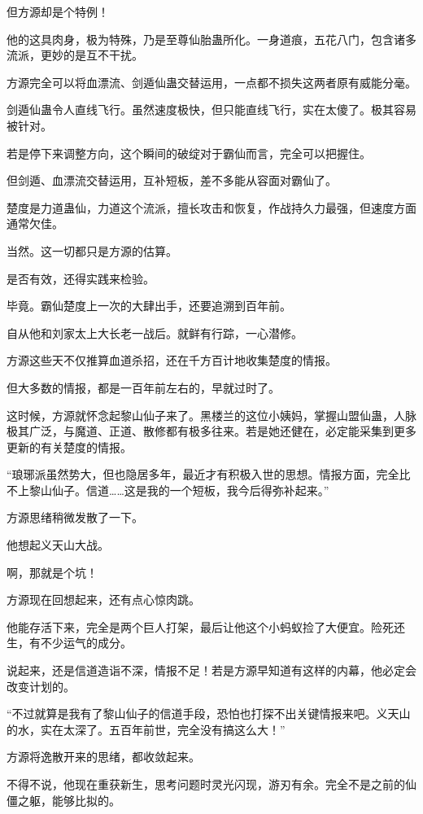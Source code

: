 \begin{this_body}
但方源却是个特例！

他的这具肉身，极为特殊，乃是至尊仙胎蛊所化。一身道痕，五花八门，包含诸多流派，更妙的是互不干扰。

方源完全可以将血漂流、剑遁仙蛊交替运用，一点都不损失这两者原有威能分毫。

剑遁仙蛊令人直线飞行。虽然速度极快，但只能直线飞行，实在太傻了。极其容易被针对。

若是停下来调整方向，这个瞬间的破绽对于霸仙而言，完全可以把握住。

但剑遁、血漂流交替运用，互补短板，差不多能从容面对霸仙了。

楚度是力道蛊仙，力道这个流派，擅长攻击和恢复，作战持久力最强，但速度方面通常欠佳。

当然。这一切都只是方源的估算。

是否有效，还得实践来检验。

毕竟。霸仙楚度上一次的大肆出手，还要追溯到百年前。

自从他和刘家太上大长老一战后。就鲜有行踪，一心潜修。

方源这些天不仅推算血道杀招，还在千方百计地收集楚度的情报。

但大多数的情报，都是一百年前左右的，早就过时了。

这时候，方源就怀念起黎山仙子来了。黑楼兰的这位小姨妈，掌握山盟仙蛊，人脉极其广泛，与魔道、正道、散修都有极多往来。若是她还健在，必定能采集到更多更新的有关楚度的情报。

“琅琊派虽然势大，但也隐居多年，最近才有积极入世的思想。情报方面，完全比不上黎山仙子。信道……这是我的一个短板，我今后得弥补起来。”

方源思绪稍微发散了一下。

他想起义天山大战。

啊，那就是个坑！

方源现在回想起来，还有点心惊肉跳。

他能存活下来，完全是两个巨人打架，最后让他这个小蚂蚁捡了大便宜。险死还生，有不少运气的成分。

说起来，还是信道造诣不深，情报不足！若是方源早知道有这样的内幕，他必定会改变计划的。

“不过就算是我有了黎山仙子的信道手段，恐怕也打探不出关键情报来吧。义天山的水，实在太深了。五百年前世，完全没有搞这么大！”

方源将逸散开来的思绪，都收敛起来。

不得不说，他现在重获新生，思考问题时灵光闪现，游刃有余。完全不是之前的仙僵之躯，能够比拟的。


\end{this_body}

